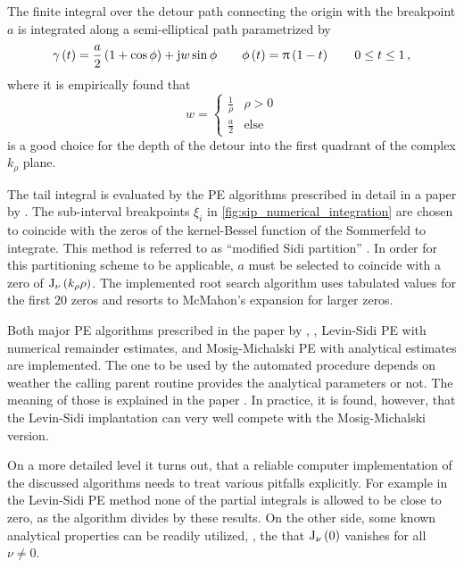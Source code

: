 The finite integral over the detour path connecting the origin with the
breakpoint $a$ is integrated along a semi-elliptical path parametrized by
\begin{equation}
    \gamma \left(t\right)
    =
    \frac{a}{2}
    \left(1 + \cos \phi\right)
    +
    \mathrm{j} w \sin \phi
    \qquad
    \phi \left(t\right)
    =
    \uppi \left(1 - t\right)
    \qquad
    0 \leq t \leq 1
    \, ,
\end{equation}
where it is empirically found that
\begin{equation}
    w = 
    \begin{cases}
        \frac{1}{\rho}  & \rho > 0 \\
        \frac{a}{2}     & \mathrm{else}
    \end{cases}
\end{equation}
is a good choice for the depth of the detour into the first quadrant of the 
complex $k_\rho$ plane.

The tail integral is evaluated by the \ac{PE} algorithms prescribed in detail
in a paper by \textcite{Michalski2016a}.
The sub-interval breakpoints $\xi_i$ in \cref{fig:sip_numerical_integration} 
are chosen to coincide with the zeros of the kernel-Bessel function of the
Sommerfeld to integrate.
This method is referred to as \enquote{modified Sidi partition}
\cite{Michalski2016a}.
In order for this partitioning scheme to be applicable, $a$ must be selected
to coincide with a zero of $\operatorname{J}_{\nu}\left(k_\rho \rho\right)$.
The implemented root search algorithm uses tabulated values
\cite[p.~409]{Abramowitz2014} for the first $\num{20}$ zeros and resorts to
McMahon's \cite[p.~236]{Olver2010} expansion for larger zeros.

Both major \ac{PE} algorithms prescribed in the paper by
\textcite{Michalski2016a}, \ie, Levin-Sidi \ac{PE} with numerical remainder
estimates, and Mosig-Michalski \ac{PE} with analytical estimates
are implemented.
The one to be used by the automated procedure depends on weather the calling
parent routine provides the analytical parameters or not.
The meaning of those is explained in the paper \cite[eq.~(70)]{Michalski2016a}.
In practice, it is found, however, that the Levin-Sidi implantation can very 
well compete with the Mosig-Michalski version.

On a more detailed level it turns out, that a reliable computer implementation
of the discussed algorithms needs to treat various pitfalls explicitly.
For example in the Levin-Sidi \ac{PE} method none of the partial integrals is
allowed to be close to zero, as the algorithm divides by these results.
On the other side, some known analytical properties can be readily utilized,
\eg, the that $\operatorname{J}_{\nu} \left(0\right)$ vanishes for all $\nu \neq 0$.






